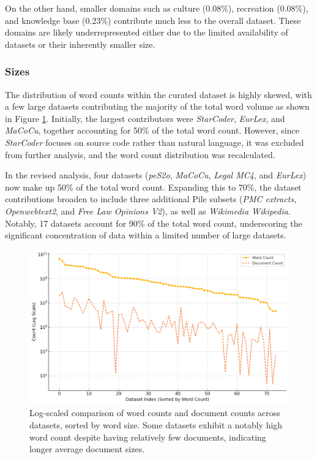 On the other hand, smaller domains such as culture (0.08\%), recreation (0.08\%), and knowledge base (0.23\%) contribute much less to the overall dataset. These domains are likely underrepresented either due to the limited availability of datasets or their inherently smaller size. 


\subsubsection{Sizes}

The distribution of word counts within the curated dataset is highly skewed, with a few large datasets contributing the majority of the total word volume as shown in Figure \ref{fig:curated_size}. Initially, the largest contributors were \textit{StarCoder}, \textit{EurLex}, and \textit{MaCoCu}, together accounting for 50\% of the total word count. However, since \textit{StarCoder} focuses on source code rather than natural language, it was excluded from further analysis, and the word count distribution was recalculated.

In the revised analysis, four datasets (\textit{peS2o}, \textit{MaCoCu}, \textit{Legal MC4}, and \textit{EurLex}) now make up 50\% of the total word count. Expanding this to 70\%, the dataset contributions broaden to include three additional Pile subsets (\textit{PMC extracts}, \textit{Openwebtext2}, and \textit{Free Law Opinions V2}), as well as \textit{Wikimedia Wikipedia}. Notably, 17 datasets account for 90\% of the total word count, underscoring the significant concentration of data within a limited number of large datasets.

\begin{figure}
    \centering
    \includegraphics[width=0.7\linewidth]{images/Analysis/curated_size_log.png}
 \caption{Log-scaled comparison of word counts and document counts across datasets, sorted by word size. Some datasets exhibit a notably high word count despite having relatively few documents, indicating longer average document sizes.}    \label{fig:curated_size}
\end{figure}

